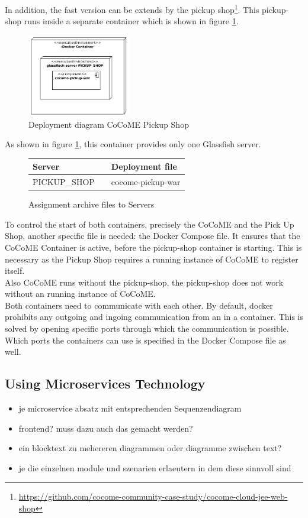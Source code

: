 	In addition, the fast version can be extends by the pickup shop\footnote{\url{https://github.com/cocome-community-case-study/cocome-cloud-jee-web-shop}}. This pickup-shop runs inside a separate container which is shown in figure \ref{Deploym_Pickup}.  
	\begin{figure}[h]
		\centering
		\includegraphics[width = 0.4\textwidth]{img/docker_Container_PickUP.png}
		\caption{Deployment diagram CoCoME Pickup Shop}
		\label{Deploym_Pickup}
	\end{figure}
	As shown in figure \ref*{Deploym_Pickup}, this container provides only one Glassfish server.
	\begin{figure}[H]
		\centering
		\begin{tabular}{p{}|p{}p{}}
			Server && Deployment file \\
			\hline
			PICKUP\_SHOP && cocome-pickup-war \\	
		\end{tabular}
		\caption{Assignment archive files to Servers}
		\label{table_assignment_pickup}
	\end{figure}
	To control the start of both containers, precisely the CoCoME and the Pick Up Shop, another specific file is needed: the Docker Compose file. It ensures that the CoCoME Container is active, before the pickup-shop container is starting. This is necessary as the Pickup Shop requires a running instance of CoCoME to register itself.\\
	Also CoCoME runs without the pickup-shop, the pickup-shop does not work without an running instance of CoCoME.\\
	Both containers need to communicate with each other. By default, docker prohibits any outgoing and ingoing communication from an in a container. This is solved by opening specific ports through which the communication is possible. Which ports the containers can use is specified in the Docker Compose file as well.
	
\subsection{Using Microservices Technology} \label{MS}
	\begin{itemize}
		\item je microservice absatz mit entsprechenden Sequenzendiagram %
		\item frontend? muss dazu auch das gemacht werden?
		\item ein blocktext zu mehereren diagrammen oder diagramme zwischen text?
		
	
			\item je die einzelnen module und szenarien erlaeutern in dem diese sinnvoll sind
	\end{itemize}
	

